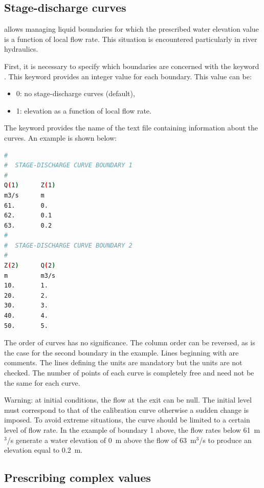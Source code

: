 \subsection{Stage-discharge curves}
\label{sec:discharge}
 allows managing liquid boundaries for which the prescribed water
elevation value is a function of local flow rate. This situation is encountered
particularly in river hydraulics.

First, it is necessary to specify which boundaries are concerned with the
keyword . This keyword provides an integer value
for each boundary. This value can be:

\begin{itemize}
\item 0: no stage-discharge curves (default),

\item 1: elevation as a function of local flow rate.
\end{itemize}

The keyword  provides the name of the text
file containing information about the curves. An example is shown below:

\begin{lstlisting}[language=bash]
#
#  STAGE-DISCHARGE CURVE BOUNDARY 1
#
Q(1)      Z(1)
m3/s      m
61.       0.
62.       0.1
63.       0.2
#
#  STAGE-DISCHARGE CURVE BOUNDARY 2
#
Z(2)      Q(2)
m         m3/s
10.       1.
20.       2.
30.       3.
40.       4.
50.       5.
\end{lstlisting}

The order of curves has no significance. The column order can be reversed, as
is the case for the second boundary in the example.
Lines beginning with \telfile{\#} are comments.
The lines defining the units are mandatory but the units are not checked.
The number of points of each curve is completely free and need not be
the same for each curve.

Warning: at initial conditions, the flow at the exit can be null. The initial
level must correspond to that of the calibration curve otherwise a sudden
change is imposed. To avoid extreme situations, the curve should be limited to
a certain level of flow rate. In the example of boundary 1 above, the flow
rates below 61~m${}^{3}$/s generate a water elevation of 0~m above the flow of
63~m${}^{3}$/s to produce an elevation equal to 0.2~m.

\subsection{Prescribing complex values}

